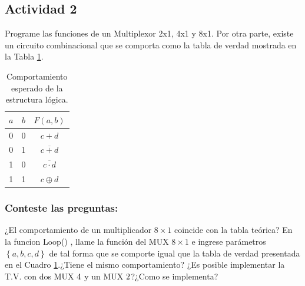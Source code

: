 \subsection{Actividad 2}

Programe las funciones de un Multiplexor 2x1, 4x1 y 8x1.
Por otra parte, existe un circuito  combinacional que se comporta como la tabla de verdad mostrada en la Tabla \ref{tab:tv}.

\begin{table}[H]
\centering
\caption{Comportamiento esperado de la estructura lógica.}
\label{tab:tv}
\begin{tabular}{ccc}
    \toprule 
    $a$ & $b$ & $F(a,b)$ \\ 
    \midrule
    0 & 0 & $c + d$ \\ 
    0 & 1 & $\overline{c + d}$ \\ 
    1 & 0 & $\overline{c \cdot d}$ \\ 
    1 & 1 & $c \oplus d$ \\ 
    \bottomrule
\end{tabular} 

\end{table}

\subsubsection{Conteste las preguntas:}

¿El comportamiento de un multiplicador $8 \times 1$ coincide con la tabla teórica?
En la funcion Loop() , llame la función del MUX  $8 \times 1$ e ingrese parámetros $\left\lbrace a,b,c,d \right\rbrace $ de tal forma que se comporte igual que la tabla de verdad presentada en el Cuadro \ref{tab:tv}.¿Tiene el mismo comportamiento?
¿Es posible implementar la T.V. con dos MUX $4 \time 1$ y un MUX  $2 \time 1$?¿Como se implementa?
